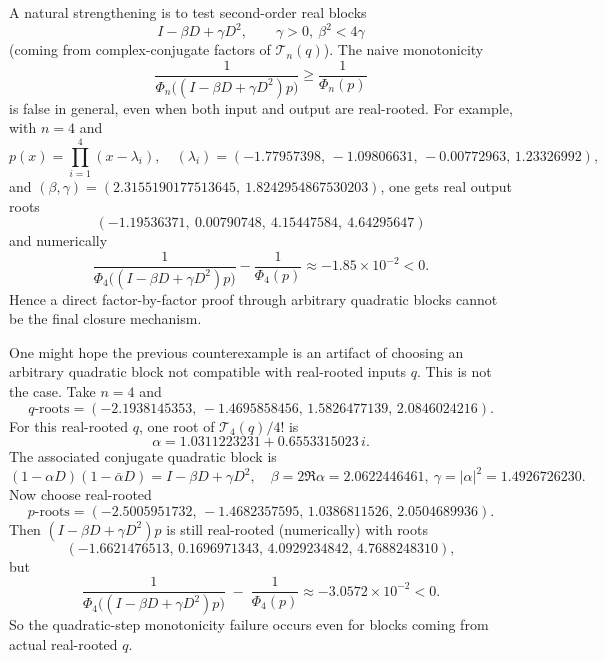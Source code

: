 \begin{remark}
A natural strengthening is to test second-order real blocks
\[
I-\beta D+\gamma D^2,\qquad \gamma>0,\ \beta^2<4\gamma
\]
(coming from complex-conjugate factors of $\mathcal T_n(q)$).
The naive monotonicity
\[
\frac1{\Phi_n\!\big((I-\beta D+\gamma D^2)p\big)}
\ge
\frac1{\Phi_n(p)}
\]
is false in general, even when both input and output are real-rooted.
For example, with $n=4$ and
\[
p(x)=\prod_{i=1}^4 (x-\lambda_i),\quad
(\lambda_i)=(-1.77957398,\,-1.09806631,\,-0.00772963,\,1.23326992),
\]
and $(\beta,\gamma)=(2.3155190177513645,\ 1.8242954867530203)$, one gets
real output roots
\[
(-1.19536371,\ 0.00790748,\ 4.15447584,\ 4.64295647)
\]
and numerically
\[
\frac1{\Phi_4\!\big((I-\beta D+\gamma D^2)p\big)}
-\frac1{\Phi_4(p)}\approx -1.85\times 10^{-2}<0.
\]
Hence a direct factor-by-factor proof through arbitrary quadratic blocks
cannot be the final closure mechanism.
\end{remark}

\begin{remark}
One might hope the previous counterexample is an artifact of choosing
an arbitrary quadratic block not compatible with real-rooted inputs $q$.
This is not the case.
Take $n=4$ and
\[
q\text{-roots}=(-2.1938145353,\,-1.4695858456,\,1.5826477139,\,2.0846024216).
\]
For this real-rooted $q$, one root of $\mathcal T_4(q)/4!$ is
\[
\alpha=1.0311223231+0.6553315023\,i.
\]
The associated conjugate quadratic block is
\[
(1-\alpha D)(1-\bar\alpha D)=I-\beta D+\gamma D^2,\quad
\beta=2\Re\alpha=2.0622446461,\ \gamma=|\alpha|^2=1.4926726230.
\]
Now choose real-rooted
\[
p\text{-roots}=(-2.5005951732,\,-1.4682357595,\,1.0386811526,\,2.0504689936).
\]
Then $(I-\beta D+\gamma D^2)p$ is still real-rooted (numerically)
with roots
\[
(-1.6621476513,\,0.1696971343,\,4.0929234842,\,4.7688248310),
\]
but
\[
\frac1{\Phi_4\!\big((I-\beta D+\gamma D^2)p\big)}
\;-\;
\frac1{\Phi_4(p)}
\approx -3.0572\times 10^{-2}<0.
\]
So the quadratic-step monotonicity failure occurs even for blocks
coming from actual real-rooted $q$.
\end{remark}

